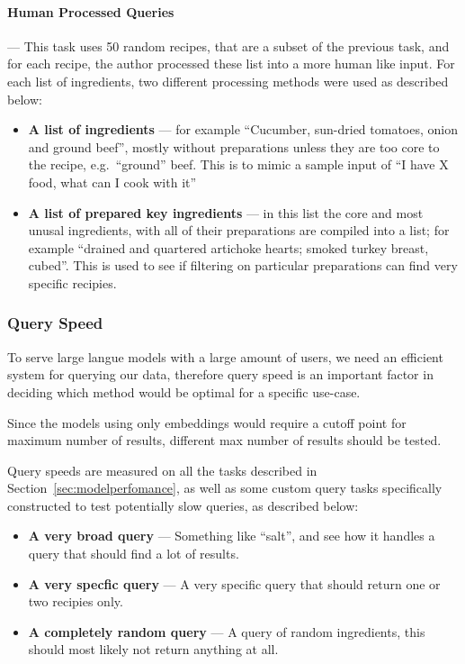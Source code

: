 \documentclass[11pt]{article}
\begin{document}
\paragraph{Human Processed Queries} --- This task uses 50 random recipes, that
are a subset of the previous task, and for each recipe, the author processed
these list into a more human like input.
For each list of ingredients, two different processing methods were used as
described below:
\begin{itemize}
    \item \textbf{A list of ingredients} --- for example ``Cucumber,
        sun-dried tomatoes, onion and ground beef'', mostly without preparations
        unless they are too core to the recipe, e.g.\ ``ground'' beef.
        This is to mimic a sample input of ``I have X food, what can I cook with it''
    \item \textbf{A list of prepared key ingredients} --- in this list the core
        and most unusal ingredients, with all of their preparations are compiled
        into a list; for example ``drained
        and quartered artichoke hearts; smoked turkey breast, cubed''.
        This is used to see if filtering on particular preparations can find
        very specific recipies.
\end{itemize}

\subsubsection{Query Speed}
To serve large langue models with a large amount of users, we need an efficient
system for querying our data, therefore query speed is an important factor in
deciding which method would be optimal for a specific use-case.

Since the models using only embeddings would require a cutoff point for
maximum number of results, different max number of results should be tested.

Query speeds are measured on all the tasks described in
Section~\ref{sec:modelperfomance}, as well as some custom query tasks
specifically constructed to test potentially slow queries, as described below:
\begin{itemize}
    \item \textbf{A very broad query} --- Something like ``salt'', and see how it
        handles a query that should find a lot of results.
    \item \textbf{A very specfic query} --- A very specific query that should
        return one or two recipies only.
    \item \textbf{A completely random query} --- A query of random ingredients,
        this should most likely not return anything at all.
\end{itemize}
\end{document}
